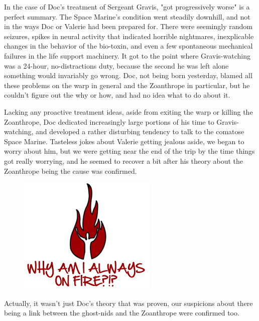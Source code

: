 In the case of Doc's treatment of Sergeant Gravis, "got progressively worse" is a perfect summary. 
The Space Marine's condition went steadily downhill, and not in the ways Doc or Valerie had been prepared for. 
There were seemingly random seizures, spikes in neural activity that indicated horrible nightmares, inexplicable changes in the behavior of the bio-toxin, and even a few spontaneous mechanical failures in the life support machinery. 
It got to the point where Gravis-watching was a 24-hour, no-distractions duty, because the second he was left alone something would invariably go wrong. 
Doc, not being born yesterday, blamed all these problems on the warp in general and the Zoanthrope in particular, but he couldn't figure out the why or how, and had no idea what to do about it.

Lacking any proactive treatment ideas, aside from exiting the warp or killing the Zoanthrope, Doc dedicated increasingly large portions of his time to Gravis-watching, and developed a rather disturbing tendency to talk to the comatose Space Marine. 
Tasteless jokes about Valerie getting jealous aside, we began to worry about him, but we were getting near the end of the trip by the time things got really worrying, and he seemed to recover a bit after his theory about the Zoanthrope being the cause was confirmed.

\begin{figure}
	\begin{center}
		\includegraphics[width=\figwidth]{pics/15/17.png}
	\end{center}
\end{figure}
Actually, it wasn't just Doc's theory that was proven, our suspicions about there being a link between the ghost-nids and the Zoanthrope were confirmed too. 


